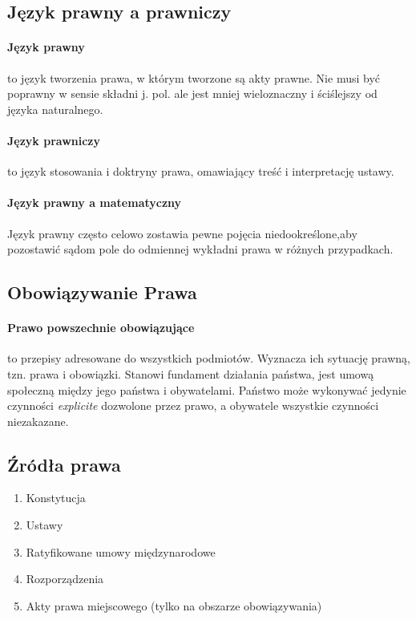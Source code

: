 \documentclass{article}
\begin{document}
\subsection{Język prawny a prawniczy}

\paragraph{Język prawny} to język tworzenia prawa, w którym tworzone są akty prawne.
Nie musi być poprawny w sensie składni j. pol. ale jest mniej wieloznaczny i ściślejszy
od języka naturalnego.

\paragraph{Język prawniczy} to język stosowania i doktryny prawa, omawiający treść
i interpretację ustawy.

\paragraph{Język prawny a matematyczny}
Język prawny często celowo zostawia pewne pojęcia niedookreślone,aby pozostawić
sądom pole do odmiennej wykładni prawa w różnych przypadkach.

\subsection{Obowiązywanie Prawa}

\paragraph{Prawo powszechnie obowiązujące} to przepisy adresowane do wszystkich podmiotów.
Wyznacza ich sytuację prawną, tzn. prawa i obowiązki.
Stanowi fundament działania państwa,
jest umową społeczną między jego państwa i obywatelami.
Państwo może wykonywać jedynie czynności \textit{explicite} dozwolone przez prawo,
a obywatele wszystkie czynności niezakazane.

\subsection{Źródła prawa}
\begin{enumerate}
  \item Konstytucja
  \item Ustawy
  \item Ratyfikowane umowy międzynarodowe
  \item Rozporządzenia
  \item Akty prawa miejscowego (tylko na obszarze obowiązywania)
\end{enumerate}
\end{document}
